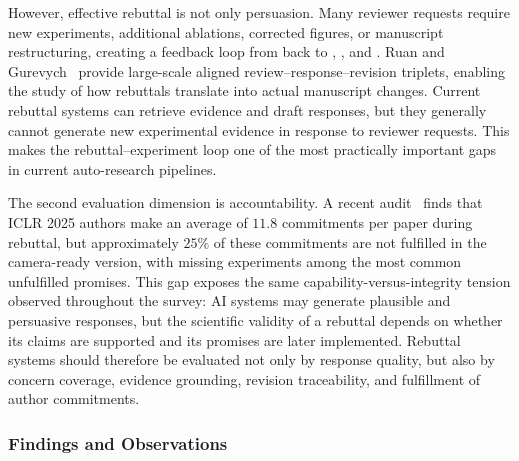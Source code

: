 However, effective rebuttal is not only persuasion. Many reviewer requests require new experiments, additional ablations, corrected figures, or manuscript restructuring, creating a feedback loop from \Sseven back to \Sthree, \Sfour, and \Sfive. Ruan and Gurevych~\cite{ruan2026authorinloop} provide large-scale aligned review--response--revision triplets, enabling the study of how rebuttals translate into actual manuscript changes. Current rebuttal systems can retrieve evidence and draft responses, but they generally cannot generate new experimental evidence in response to reviewer requests. This makes the rebuttal--experiment loop one of the most practically important gaps in current auto-research pipelines.

The second evaluation dimension is accountability. A recent audit~\cite{rebuttalcommitment2026} finds that ICLR 2025 authors make an average of $11.8$ commitments per paper during rebuttal, but approximately $25\%$ of these commitments are not fulfilled in the camera-ready version, with missing experiments among the most common unfulfilled promises. This gap exposes the same capability-versus-integrity tension observed throughout the survey: AI systems may generate plausible and persuasive responses, but the scientific validity of a rebuttal depends on whether its claims are supported and its promises are later implemented. Rebuttal systems should therefore be evaluated not only by response quality, but also by concern coverage, evidence grounding, revision traceability, and fulfillment of author commitments.






\subsubsection{Findings and Observations}
\label{sec:s7_findings}

